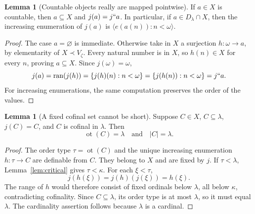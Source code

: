 \documentclass[11pt,letterpaper]{article}
\theoremstyle{definition}
\newtheorem{lemma}[definition]{Lemma}
\newcommand{\ot}{\operatorname{ot}}
\numberwithin{equation}{section}
\newcommand{\ran}{\operatorname{ran}}
\begin{document}
\begin{lemma}[Countable objects really are mapped pointwise]\label{lem:countable}
If $a\in X$ is countable, then $a\subseteq X$ and $j(a)=j``a$. In particular, if $a\in D_\lambda\cap X$, then the increasing enumeration of $j(a)$ is $\langle e(a(n)):n<\omega\rangle$.
\end{lemma}
\begin{proof}
The case $a=\varnothing$ is immediate. Otherwise take in $X$ a surjection $h:\omega\to a$, by elementarity of $X\prec V_\zeta$. Every natural number is in $X$, so $h(n)\in X$ for every $n$, proving $a\subseteq X$. Since $j(\omega)=\omega$,
\[
j(a)=\ran(j(h))=\{j(h)(n):n<\omega\}=\{j(h(n)):n<\omega\}=j``a.
\]
For increasing enumerations, the same computation preserves the order of the values.
\end{proof}

\begin{lemma}[A fixed cofinal set cannot be short]\label{lem:fixed-cofinal}
Suppose $C\in X$, $C\subseteq\lambda$, $j(C)=C$, and $C$ is cofinal in $\lambda$. Then
\[
\ot(C)=\lambda\quad\text{and}\quad |C|=\lambda.
\]
\end{lemma}
\begin{proof}
The order type $\tau=\ot(C)$ and the unique increasing enumeration $h:\tau\to C$ are definable from $C$. They belong to $X$ and are fixed by $j$. If $\tau<\lambda$, Lemma~\ref{lem:critical} gives $\tau<\kappa$. For each $\xi<\tau$,
\[
j(h(\xi))=j(h)(j(\xi))=h(\xi).
\]
The range of $h$ would therefore consist of fixed ordinals below $\lambda$, all below $\kappa$, contradicting cofinality. Since $C\subseteq\lambda$, its order type is at most $\lambda$, so it must equal $\lambda$. The cardinality assertion follows because $\lambda$ is a cardinal.
\end{proof}
\end{document}
